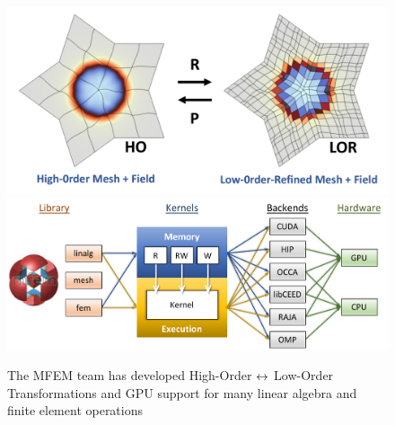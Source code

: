 \begin{figure}[tb]
\centering
\includegraphics[width=.4\textwidth]{projects/2.3.6-NNSA/2.3.6.02-LLNL-ATDM/HO-LO}
\includegraphics[width=.4\textwidth]{projects/2.3.6-NNSA/2.3.6.02-LLNL-ATDM/mfem-gpu}
\caption{The MFEM team has developed High-Order $\protect\leftrightarrow$ Low-Order Transformations and GPU support for many linear algebra and finite element operations}
\end{figure}

